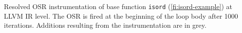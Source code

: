 \label{fig:isordfrom} Resolved OSR instrumentation of base function {\tt isord} (\myfigure\ref{fi:isord-example}) at LLVM IR level. The OSR is fired at the beginning of the loop body after 1000 iterations. Additions resulting from the instrumentation are in grey.
